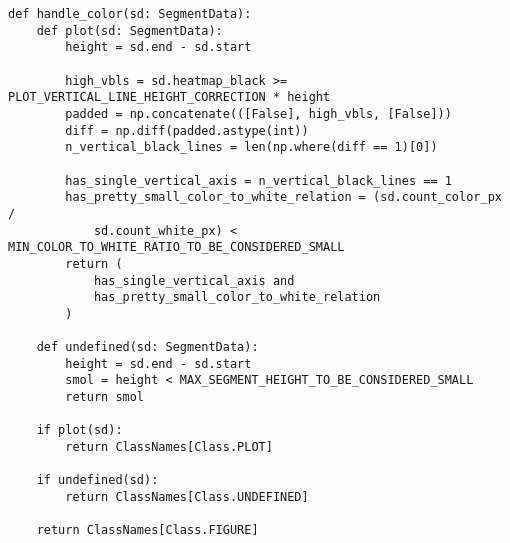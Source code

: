 \begin{lstlisting}[caption={Функция handle\_color}, label={lst:}]
def handle_color(sd: SegmentData):
    def plot(sd: SegmentData):
        height = sd.end - sd.start

        high_vbls = sd.heatmap_black >= PLOT_VERTICAL_LINE_HEIGHT_CORRECTION * height
        padded = np.concatenate(([False], high_vbls, [False]))
        diff = np.diff(padded.astype(int))
        n_vertical_black_lines = len(np.where(diff == 1)[0])

        has_single_vertical_axis = n_vertical_black_lines == 1
        has_pretty_small_color_to_white_relation = (sd.count_color_px /
            sd.count_white_px) < MIN_COLOR_TO_WHITE_RATIO_TO_BE_CONSIDERED_SMALL
        return (
            has_single_vertical_axis and
            has_pretty_small_color_to_white_relation
        )

    def undefined(sd: SegmentData):
        height = sd.end - sd.start
        smol = height < MAX_SEGMENT_HEIGHT_TO_BE_CONSIDERED_SMALL
        return smol

    if plot(sd):
        return ClassNames[Class.PLOT]

    if undefined(sd):
        return ClassNames[Class.UNDEFINED]
    
    return ClassNames[Class.FIGURE]
\end{lstlisting}

